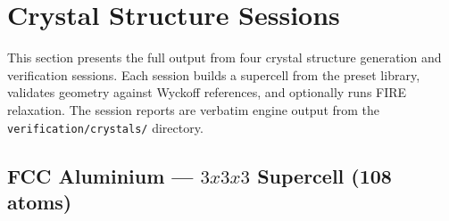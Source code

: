 \documentclass[11pt,twoside]{article}
\def\times{x}%
\begin{document}
\section{Crystal Structure Sessions}
\label{sec:crystalsessions}

This section presents the full output from four crystal structure generation and verification sessions. Each session builds a supercell from the preset library, validates geometry against Wyckoff references, and optionally runs FIRE relaxation. The session reports are verbatim engine output from the \texttt{verification/crystals/} directory.

\subsection{FCC Aluminium --- $3 \times 3 \times 3$ Supercell (108 atoms)}
\end{document}
